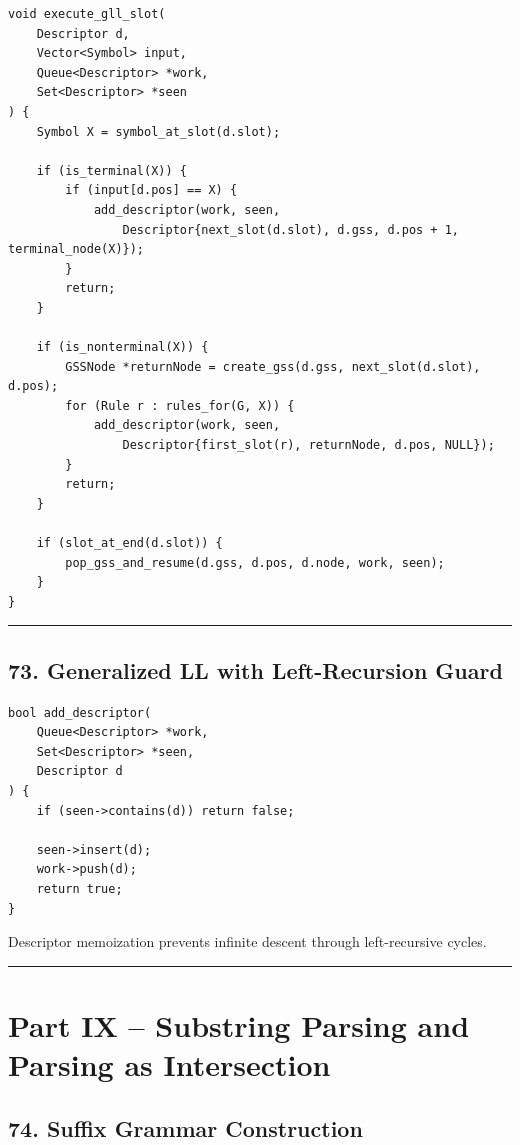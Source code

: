 \documentclass[10pt,letterpaper]{article}
\begin{document}
\begin{verbatim}
void execute_gll_slot(
    Descriptor d,
    Vector<Symbol> input,
    Queue<Descriptor> *work,
    Set<Descriptor> *seen
) {
    Symbol X = symbol_at_slot(d.slot);

    if (is_terminal(X)) {
        if (input[d.pos] == X) {
            add_descriptor(work, seen,
                Descriptor{next_slot(d.slot), d.gss, d.pos + 1, terminal_node(X)});
        }
        return;
    }

    if (is_nonterminal(X)) {
        GSSNode *returnNode = create_gss(d.gss, next_slot(d.slot), d.pos);
        for (Rule r : rules_for(G, X)) {
            add_descriptor(work, seen,
                Descriptor{first_slot(r), returnNode, d.pos, NULL});
        }
        return;
    }

    if (slot_at_end(d.slot)) {
        pop_gss_and_resume(d.gss, d.pos, d.node, work, seen);
    }
}
\end{verbatim}

\medskip\hrule\medskip

\subsection*{73. Generalized LL with Left-Recursion Guard}

\begin{verbatim}
bool add_descriptor(
    Queue<Descriptor> *work,
    Set<Descriptor> *seen,
    Descriptor d
) {
    if (seen->contains(d)) return false;

    seen->insert(d);
    work->push(d);
    return true;
}
\end{verbatim}

Descriptor memoization prevents infinite descent through left-recursive cycles.

\medskip\hrule\medskip

\clearpage
\section*{Part IX -- Substring Parsing and Parsing as Intersection}

\subsection*{74. Suffix Grammar Construction}
\end{document}
